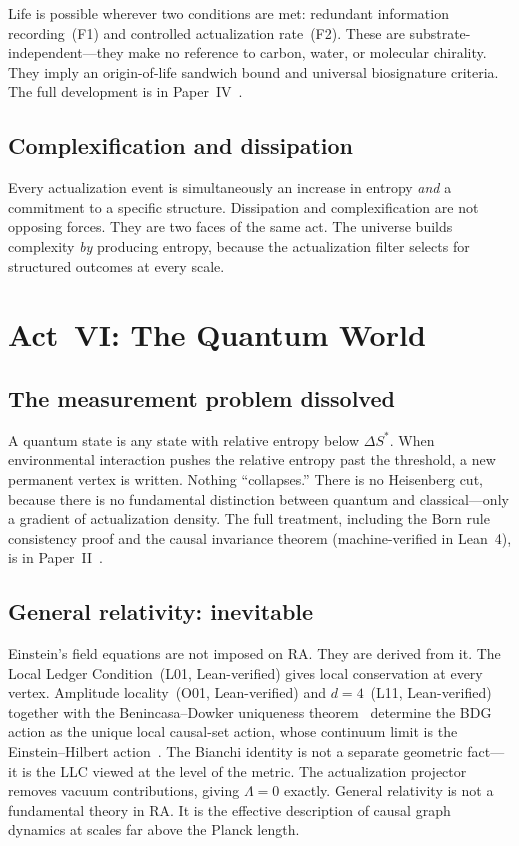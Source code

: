 \documentclass[11pt,a4paper]{article}
\theoremstyle{plain}
\theoremstyle{definition}
\theoremstyle{remark}
\begin{document}
Life is possible wherever two conditions are met: redundant information
recording~(F1) and controlled actualization rate~(F2).  These are
substrate-independent---they make no reference to carbon, water, or
molecular chirality.  They imply an origin-of-life sandwich bound and
universal biosignature criteria.  The full development is in
Paper~IV~\cite{P4}.

\subsection{Complexification and dissipation}\label{sec:complex}

Every actualization event is simultaneously an increase in entropy
\emph{and} a commitment to a specific structure.  Dissipation and
complexification are not opposing forces.  They are two faces of the same
act.  The universe builds complexity \emph{by} producing entropy, because
the actualization filter selects for structured outcomes at every scale.

\section{Act~VI: The Quantum World}\label{sec:act6}

\subsection{The measurement problem dissolved}\label{sec:measurement}

A quantum state is any state with relative entropy below $\Delta S^*$.
When environmental interaction pushes the relative entropy past the
threshold, a new permanent vertex is written.  Nothing ``collapses.''
There is no Heisenberg cut, because there is no fundamental distinction
between quantum and classical---only a gradient of actualization density.
The full treatment, including the Born rule consistency proof and the
causal invariance theorem (machine-verified in Lean~4), is in
Paper~II~\cite{P2}.

\subsection{General relativity: inevitable}\label{sec:gr}

Einstein's field equations are not imposed on RA.  They are derived from
it.  The Local Ledger Condition~(L01, Lean-verified) gives local
conservation at every vertex.  Amplitude locality~(O01, Lean-verified)
and $d = 4$~(L11, Lean-verified) together with the Benincasa--Dowker
uniqueness theorem~\cite{BenincasaDowker2010} determine the BDG action
as the unique local causal-set action, whose continuum limit is the
Einstein--Hilbert action~\cite{BenincasaDowker2010}.  The Bianchi
identity is not a separate geometric fact---it is the LLC viewed at the
level of the metric.  The actualization projector removes vacuum
contributions, giving $\Lambda = 0$ exactly.  General relativity is not a
fundamental theory in RA.  It is the effective description of causal graph
dynamics at scales far above the Planck length.
\end{document}
